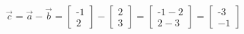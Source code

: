 \documentclass[preview]{standalone}
\begin{document}
\begin{align*}
\vec{c} = \vec{a} - \vec{b} = \begin{bmatrix} \text{-}1 \\ 2 \end{bmatrix} - \begin{bmatrix} 2 \\ 3 \end{bmatrix} = \begin{bmatrix} \text{-}1 - 2 \\ 2 - 3 \end{bmatrix} = \begin{bmatrix} \text{-}3 \\ -1 \end{bmatrix}
\end{align*}
\end{document}
